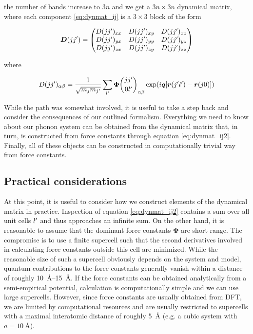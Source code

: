 \noindent the number of bands increase to $3n$ and we get a $3n \times 3n$ dynamical matrix, where each component \eqref{eq:dynmat_ij} is a $3 \times 3$ block of the form

\[
\bm{D}(jj^\prime) = \begin{pmatrix}
D(jj^\prime)_{xx} & D(jj^\prime)_{xy} & D(jj^\prime)_{xz} \\
D(jj^\prime)_{yx} & D(jj^\prime)_{yy} & D(jj^\prime)_{yz} \\
D(jj^\prime)_{zx} & D(jj^\prime)_{zy} & D(jj^\prime)_{zz}
\end{pmatrix}
\]

\noindent where

\begin{equation}
D(j\jp)_{\alpha\beta} = \frac{1}{\sqrt{m_j m_{\jp}}} \sum_{\lp} \fczero _{\alpha\beta} \exp (i\bm{q}[\bm{r}(\jp\lp) - \bm{r}(j0)]) \label{eq:dynmat_ij2}
\end{equation}

\noindent While the path was somewhat involved, it is useful to take a step back and consider the consequences of our outlined formalism. Everything we need to know about our phonon system can be obtained from the dynamical matrix that, in turn,  is constructed from force constants through equation \eqref{eq:dynmat_ij2}. Finally, all of these objects can be constructed in computationally trivial way from force constants.

\subsection{Practical considerations}\label{sec:phononpractical}
At this point, it is useful to consider how we construct elements of the dynamical matrix in practice. Inspection of equation \eqref{eq:dynmat_ij2} contains a sum over all unit cells $l^\prime$ and thus approaches an infinite sum. On the other hand, it is reasonable to assume that the dominant force constants $\bm{\Phi}$ are short range. The compromise is to use a finite supercell such that the second derivatives involved in calculating force constants outside this cell are minimized. While the reasonable size of such a supercell obviously depends on the system and model, quantum contributions to the force constants generally vanish within a distance of roughly \SIrange{10}{15}{\angstrom}. If the force constants can be obtained analytically from a semi-empirical potential, calculation is computationally simple and we can use large supercells. However, since force constants are usually obtained from DFT, we are limited by computational resources and are usually restricted to supercells with a maximal interatomic distance of roughly \SI{5}{\angstrom} (e.g. a cubic system with $a=\SI{10}{\angstrom}$).

